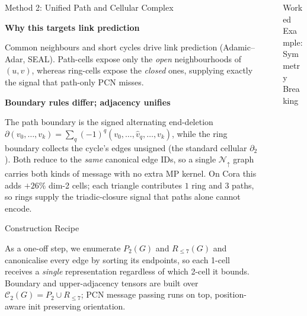 \documentclass[final]{beamer}
\renewcommand\heading[1]{%
  \par\bigskip
  {\sffamily\bfseries\large #1}\par\smallskip
}
\newlength{\sepwidth}
\newlength{\colwidth}
\newcommand{\separatorcolumn}{
  \begin{column}{\sepwidth}
\end{column}}
\begin{document}
\begin{frame}[t]
\begin{columns}[t]
\begin{column}{\colwidth}
\begin{block}{Method 2: Unified Path and Cellular Complex}
        \medskip
        \heading{Why this targets link prediction}

        Common neighbours and short cycles drive link prediction
        (Adamic--Adar, SEAL). Path-cells expose only the \emph{open}
        neighbourhoods of $(u,v)$, whereas ring-cells expose the
        \emph{closed} ones, supplying exactly the signal that
        path-only PCN misses.

        \medskip
        \heading{Boundary rules differ; adjacency unifies}

        The path boundary is the signed alternating end-deletion
        $\partial(v_0,\!\ldots\!,v_k)\!=\!\sum_q(-1)^q(v_0,\!\ldots\!,\hat v_q,\!\ldots\!,v_k)$,
        while the ring boundary collects the cycle's edges unsigned
        (the standard cellular $\partial_2$). Both reduce to the
        \emph{same} canonical edge IDs, so a single
        $\mathcal N_\uparrow$ graph carries both kinds of message
        with no extra MP kernel. On Cora this adds $+26\%$ dim-2
        cells; each triangle contributes $1$ ring and $3$ paths, so
        rings supply the triadic-closure signal that paths alone
        cannot encode.

      \end{block}

      \medskip

      \begin{block}{Construction Recipe}

        As a one-off step, we enumerate $P_2(G)$ and $R_{\leq 7}(G)$
        and canonicalise every edge by sorting its endpoints, so each
        1-cell receives a \emph{single} representation regardless of
        which 2-cell it bounds. Boundary and upper-adjacency tensors are
        built over $\mathcal C_2(G)=P_2\cup R_{\leq 7}$; PCN message
        passing runs on top, position-aware init preserving orientation.

      \end{block}

    \end{column}

    \separatorcolumn

    \begin{column}{\colwidth}

      \begin{block}{Worked Example: Symmetry Breaking}


\end{block}
\end{column}
\end{columns}
\end{frame}
\end{document}
